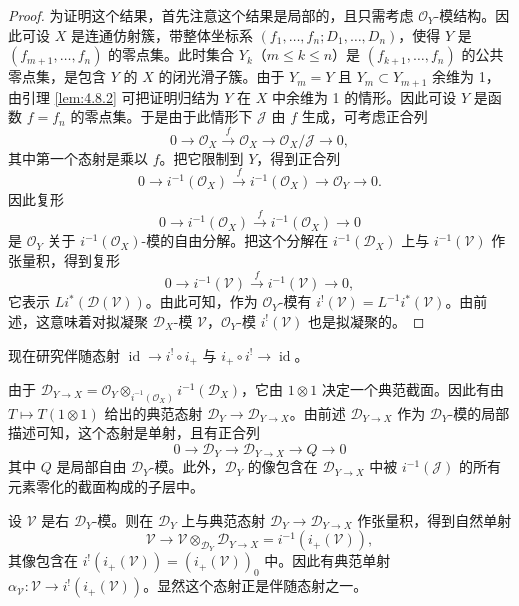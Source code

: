 \begin{proof}
为证明这个结果，首先注意这个结果是局部的，且只需考虑 $\mathcal{O}_Y$-模结构。因此可设 $X$ 是连通仿射簇，带整体坐标系 $(f_1,\dots,f_n;D_1,\dots,D_n)$，使得 $Y$ 是 $(f_{m+1},\dots,f_n)$ 的零点集。此时集合 $Y_k$（$m\le k\le n$）是 $(f_{k+1},\dots,f_n)$ 的公共零点集，是包含 $Y$ 的 $X$ 的闭光滑子簇。由于 $Y_m=Y$ 且 $Y_m\subset Y_{m+1}$ 余维为 1，由引理 \ref{lem:4.8.2} 可把证明归结为 $Y$ 在 $X$ 中余维为 1 的情形。因此可设 $Y$ 是函数 $f=f_n$ 的零点集。于是由于此情形下 $\mathcal{J}$ 由 $f$ 生成，可考虑正合列
$$0\longrightarrow\mathcal{O}_X\xrightarrow{\ f\ }\mathcal{O}_X\longrightarrow\mathcal{O}_X/\mathcal{J}\longrightarrow0,$$
其中第一个态射是乘以 $f$。把它限制到 $Y$，得到正合列
$$0\longrightarrow i^{-1}(\mathcal{O}_X)\xrightarrow{\ f\ }i^{-1}(\mathcal{O}_X)\longrightarrow\mathcal{O}_Y\longrightarrow0.$$
因此复形
$$0\longrightarrow i^{-1}(\mathcal{O}_X)\xrightarrow{\ f\ }i^{-1}(\mathcal{O}_X)\longrightarrow0$$
是 $\mathcal{O}_Y$ 关于 $i^{-1}(\mathcal{O}_X)$-模的自由分解。把这个分解在 $i^{-1}(\mathcal{D}_X)$ 上与 $i^{-1}(\mathcal{V})$ 作张量积，得到复形
$$0\longrightarrow i^{-1}(\mathcal{V})\xrightarrow{\ f\ }i^{-1}(\mathcal{V})\longrightarrow0,$$
它表示 $Li^*(\mathcal{D}(\mathcal{V}))$。由此可知，作为 $\mathcal{O}_Y$-模有 $i^!(\mathcal{V})=L^{-1}i^*(\mathcal{V})$。由前述，这意味着对拟凝聚 $\mathcal{D}_X$-模 $\mathcal{V}$，$\mathcal{O}_Y$-模 $i^!(\mathcal{V})$ 也是拟凝聚的。
\end{proof}

现在研究伴随态射 $\operatorname{id}\to i^!\circ i_+$ 与 $i_+\circ i^!\to\operatorname{id}$。

由于 $\mathcal{D}_{Y\to X}=\mathcal{O}_Y\otimes_{i^{-1}(\mathcal{O}_X)}i^{-1}(\mathcal{D}_X)$，它由 $1\otimes1$ 决定一个典范截面。因此有由
$T\mapsto T(1\otimes1)$ 给出的典范态射 $\mathcal{D}_Y\to\mathcal{D}_{Y\to X}$。由前述 $\mathcal{D}_{Y\to X}$ 作为 $\mathcal{D}_Y$-模的局部描述可知，这个态射是单射，且有正合列
$$0\longrightarrow\mathcal{D}_Y\longrightarrow\mathcal{D}_{Y\to X}\longrightarrow Q\longrightarrow0$$
其中 $Q$ 是局部自由 $\mathcal{D}_Y$-模。此外，$\mathcal{D}_Y$ 的像包含在 $\mathcal{D}_{Y\to X}$ 中被 $i^{-1}(\mathcal{J})$ 的所有元素零化的截面构成的子层中。

设 $\mathcal{V}$ 是右 $\mathcal{D}_Y$-模。则在 $\mathcal{D}_Y$ 上与典范态射 $\mathcal{D}_Y\to\mathcal{D}_{Y\to X}$ 作张量积，得到自然单射
$$\mathcal{V}\longrightarrow\mathcal{V}\otimes_{\mathcal{D}_Y}\mathcal{D}_{Y\to X}=i^{-1}(i_+(\mathcal{V})),$$
其像包含在 $i^!(i_+(\mathcal{V}))=(i_+(\mathcal{V}))_0$ 中。因此有典范单射 $\alpha_{\mathcal{V}}:\mathcal{V}\to i^!(i_+(\mathcal{V}))$。显然这个态射正是伴随态射之一。


